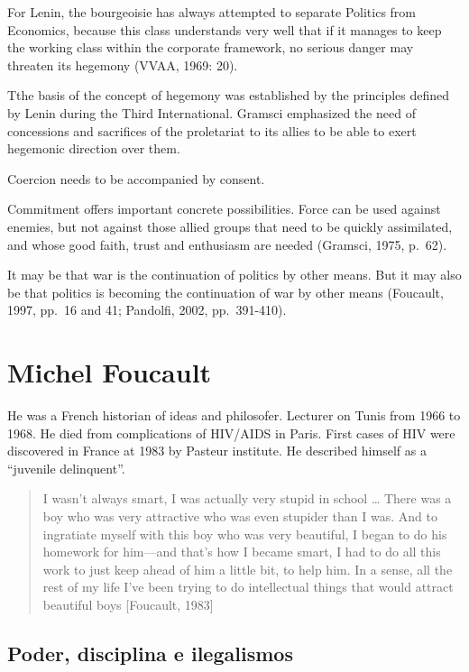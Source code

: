\documentclass[
  letterpaper,
  DIV=11,
  numbers=noendperiod]{scrreprt}
\begin{document}
For Lenin, the bourgeoisie has always attempted to separate Politics
from Economics, because this class understands very well that if it
manages to keep the working class within the corporate framework, no
serious danger may threaten its hegemony (VVAA, 1969: 20).

Tthe basis of the concept of hegemony was established by the principles
defined by Lenin during the Third International. Gramsci emphasized the
need of concessions and sacrifices of the proletariat to its allies to
be able to exert hegemonic direction over them.

Coercion needs to be accompanied by consent.

Commitment offers important concrete possibilities. Force can be used
against enemies, but not against those allied groups that need to be
quickly assimilated, and whose good faith, trust and enthusiasm are
needed (Gramsci, 1975, p.~62).

It may be that war is the continuation of politics by other means. But
it may also be that politics is becoming the continuation of war by
other means (Foucault, 1997, pp.~16 and 41; Pandolfi, 2002,
pp.~391-410).

\section{Michel Foucault}\label{michel-foucault}

He was a French historian of ideas and philosofer. Lecturer on Tunis
from 1966 to 1968. He died from complications of HIV/AIDS in Paris.
First cases of HIV were discovered in France at 1983 by Pasteur
institute. He described himself as a ``juvenile delinquent''.

\begin{quote}
I wasn't always smart, I was actually very stupid in school \ldots{}
There was a boy who was very attractive who was even stupider than I
was. And to ingratiate myself with this boy who was very beautiful, I
began to do his homework for him---and that's how I became smart, I had
to do all this work to just keep ahead of him a little bit, to help him.
In a sense, all the rest of my life I've been trying to do intellectual
things that would attract beautiful boys {[}Foucault, 1983{]}
\end{quote}

\subsection{Poder, disciplina e
ilegalismos}\label{poder-disciplina-e-ilegalismos}
\end{document}
